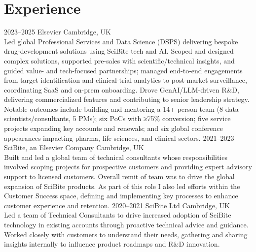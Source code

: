 \section{Experience}
\begin{entrylist}
\entry
    {2023--2025}
    {Elsevier}
    {Cambridge, UK}
    {\\
    Led global Professional Services and Data Science (DSPS) delivering bespoke drug-development solutions using SciBite tech and AI. Scoped and designed complex solutions, supported pre-sales with scientific/technical insights, and guided value- and tech-focused partnerships; managed end-to-end engagements from target identification and clinical-trial analytics to post-market surveillance, coordinating SaaS and on-prem onboarding. Drove GenAI/LLM-driven R\&D, delivering commercialized features and contributing to senior leadership strategy. Notable outcomes include building and mentoring a 14+ person team (8 data scientists/consultants, 5 PMs); six PoCs with ≥75\% conversion; five service projects expanding key accounts and renewals; and six global conference appearances impacting pharma, life sciences, and clinical sectors.}
\entry
  {2021--2023}
  {SciBite, an Elsevier Company}
  {Cambridge, UK}
  {\\
  Built and led a global team of technical consultants whose responsibilities involved scoping projects for prospective customers and providing expert advisory support to licensed customers. Overall remit of team was to drive the global expansion of SciBite products. As part of this role I also led efforts within the Customer Success space, defining and implementing key processes to enhance customer experience and retention.} 
\entry
  {2020--2021}
  {SciBite Ltd}
  {Cambridge, UK}
  {\\
  Led a team of Technical Consultants to drive increased adoption of SciBite technology in existing accounts through proactive technical advice and guidance. Worked closely with customers to understand their needs, gathering and sharing insights internally to influence product roadmaps and R\&D innovation.}
\end{entrylist}